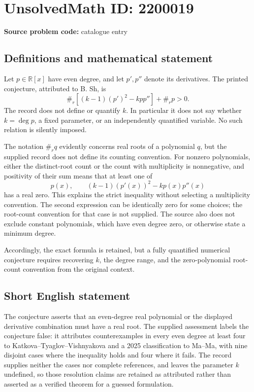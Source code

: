 \documentclass[11pt]{article}
\newcommand{\R}{\mathbb{R}}
\begin{document}
\section*{UnsolvedMath ID: 2200019}
\textbf{Source problem code:} catalogue entry
\subsection{Definitions and mathematical statement}
Let $p\in\R[x]$ have even degree, and let $p',p''$ denote its derivatives. The printed conjecture, attributed to B. Sh, is
\[
 \#_r\!\left[(k-1)(p')^2-kpp''\right]+\#_r p>0.
\]
The record does not define or quantify $k$. In particular it does not say whether $k=\deg p$, a fixed parameter, or an independently quantified variable. No such relation is silently imposed.

The notation $\#_r q$ evidently concerns real roots of a polynomial $q$, but the supplied record does not define its counting convention. For nonzero polynomials, either the distinct-root count or the count with multiplicity is nonnegative, and positivity of their sum means that at least one of
\[
 p(x),\qquad (k-1)(p'(x))^2-kp(x)p''(x)
\]
has a real zero. This explains the strict inequality without selecting a multiplicity convention. The second expression can be identically zero for some choices; the root-count convention for that case is not supplied. The source also does not exclude constant polynomials, which have even degree zero, or otherwise state a minimum degree.

Accordingly, the exact formula is retained, but a fully quantified numerical conjecture requires recovering $k$, the degree range, and the zero-polynomial root-count convention from the original context.
\subsection{Short English statement}
The conjecture asserts that an even-degree real polynomial or the displayed derivative combination must have a real root. The supplied assessment labels the conjecture false: it attributes counterexamples in every even degree at least four to Katkova--Tyaglov--Vishnyakova and a 2025 classification to Ma--Ma, with nine disjoint cases where the inequality holds and four where it fails. The record supplies neither the cases nor complete references, and leaves the parameter $k$ undefined, so those resolution claims are retained as attributed rather than asserted as a verified theorem for a guessed formulation.
\end{document}
